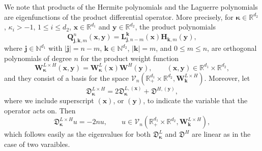 \documentclass{amsart}
\theoremstyle{remark}
\def\fD{{\mathfrak D}}
\def\k{{\kappa}}
\def\jb{{\bm j}}
\def\kb{{\bm k}}
\def\xb{{\bm x}}
\def\yb{{\bm y}}
\def\Hb{{\bm H}}
\def\Lb{{\bm L}}
\def\Qb{{\bm Q}}
\def\Wb{{\bm W}}
\def\CV{{\mathcal V}}
\def\NN{{\mathbb N}}
\def\RR{{\mathbb R}}
\def\bk{{\boldsymbol{\kappa}}}
\begin{document}
We note that products of the Hermite polynomials and the Laguerre polynomials are eigenfunctions of the 
product differential operator. More precisely, for $\bk \in \RR^{d_2}$, $\k_i > -1$, $1 \le i \le d_2$, $\xb \in \RR^{d_1}$
and $\yb \in \RR^{d_2}$, the product polynomials
$$
  \Qb_{\jb, \kb, m}^n (\xb, \yb) = \Lb_{\jb,n-m}^\kb(\xb) \Hb_{\kb, m}(\yb),
$$
where $\jb \in \NN^{d_1}$ with $|\jb| = n-m$, $\kb \in \NN^{d_2}$, $|\kb| = m$, and $0 \le m \le n$, are orthogonal 
polynomials of degree $n$ for the product weight function 
\begin{equation}\label{eq:W_LtimeH}
  \Wb_\bk^{L\times H}(\xb,\yb) = \Wb_\bk^L(\xb) \Wb^H(\yb), \qquad (\xb,\yb) \in \RR^{d_1}\times \RR^{d_2},
\end{equation}
and they consist of a basis for the space $\CV_n(\RR_+^{d_1} \times \RR^{d_2}, \Wb_\kb^{L\times H})$. Moreover,
let 
\begin{equation} \label{eq:fD-Hd}
  \fD_{\bk}^{L\times H} =  2 \fD_\bk^{L, (\xb)} + \fD^{H, (\yb)},
\end{equation}
where we include superscript $(\xb)$, or $(\yb)$, to indicate the variable that the operator acts on. Then
\begin{equation}\label{eq:eigen_LtimeH}
  \fD_{\bk}^{L \times H} u = - 2 n u, \qquad u \in \CV_n(\RR_+^{d_1} \times \RR^{d_2}, \Wb_\kb^{L\times H}),
\end{equation}
which follows easily as the eigenvalues for both $\fD_\bk^L$ and $\fD^H$ are linear as in the case of two varaibles. 

\end{document}
